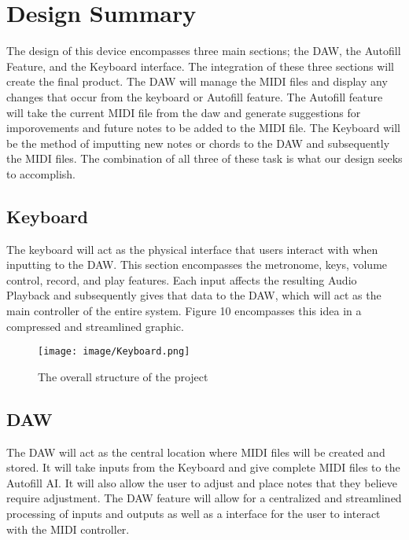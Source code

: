 \section{Design Summary}

The design of this device encompasses three main sections; the DAW, the Autofill Feature,
and the Keyboard interface. The integration of these three sections will create the final
product. The DAW will manage the MIDI files and display any changes that occur from the
keyboard or Autofill feature. The Autofill feature will take the current MIDI file from
the daw and generate suggestions for imporovements and future notes to be added to the
MIDI file. The Keyboard will be the method of imputting new notes or chords to the DAW and
subsequently the MIDI files. The combination of all three of these task is what our design
seeks to accomplish.

\newpage
\subsection{Keyboard}

The keyboard will act as the physical interface that users interact with when inputting to
the DAW. This section encompasses the metronome, keys, volume control, record, and play
features. Each input affects the resulting Audio Playback and subsequently gives that data
to the DAW, which will act as the main controller of the entire system. Figure 10
encompasses this idea in a compressed and streamlined graphic.

\begin{figure}[h!]
  \centering
  \texttt{[image: image/Keyboard.png]}
  \caption{The overall structure of the project}
  \label{fig:keyboard_diagram}
\end{figure}

\newpage
\subsection{DAW}

The DAW will act as the central location where MIDI files will be created and stored. It
will take inputs from the Keyboard and give complete MIDI files to the Autofill AI. It
will also allow the user to adjust and place notes that they believe require adjustment.
The DAW feature will allow for a centralized and streamlined processing of inputs and
outputs as well as a interface for the user to interact with the MIDI controller.

